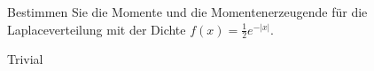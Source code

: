 \begin{exercise}
Bestimmen Sie die Momente und die Momentenerzeugende für die Laplaceverteilung
mit der Dichte $f(x) = \frac{1}{2}e^{-|x|}$.
\end{exercise}

\begin{solution}

Trivial

\end{solution}
